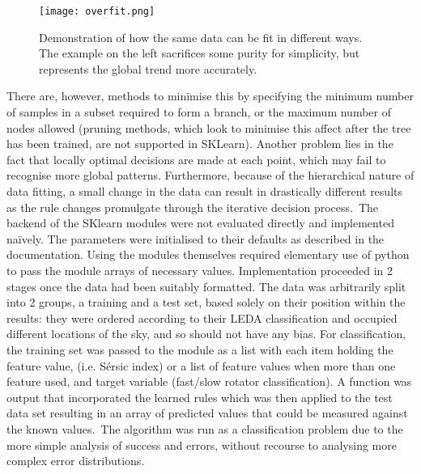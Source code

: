 \begin{figure}[t]
	\centering
	\texttt{[image: overfit.png]}
	\caption{Demonstration of how the same data can be fit in different ways. The example on the left sacrifices some purity for simplicity, but represents the global trend more accurately\cite{ofit}.}
	\label{fig:overfit}
\end{figure}
There are, however, methods to minimise this by specifying the minimum number of samples in a subset required to form a branch, or the maximum number of nodes allowed (pruning methods, which look to minimise this affect after the tree has been trained, are not supported in SKLearn). Another problem lies in the fact that locally optimal decisions are made at each point, which may fail to recognise more global patterns. Furthermore, because of the hierarchical nature of data fitting, a small change in the data can result in drastically different results as the rule changes promulgate through the iterative decision process.\
The backend of the SKlearn modules were not evaluated directly and implemented na\"{i}vely. The parameters were initialised to their defaults as described in the documentation\cite{sklearn}. Using the modules themselves required elementary use of python to pass the module arrays of necessary values. Implementation proceeded in 2 stages once the data had been suitably formatted. The data was arbitrarily split into 2 groups, a training and a test set, based solely on their position within the results: they were ordered according to their LEDA classification and occupied different locations of the sky, and so should not have any bias. For classification, the training set was passed to the module as a list with each item holding the feature value, (i.e. S\'{e}rsic index) or a list of feature values when more than one feature used, and target variable (fast/slow rotator classification). A function was output that incorporated the learned rules which was then applied to the test data set resulting in an array of predicted values that could be measured against the known values.\
The algorithm was run as a classification problem due to the more simple analysis of success and errors, without recourse to analysing more complex error distributions.
